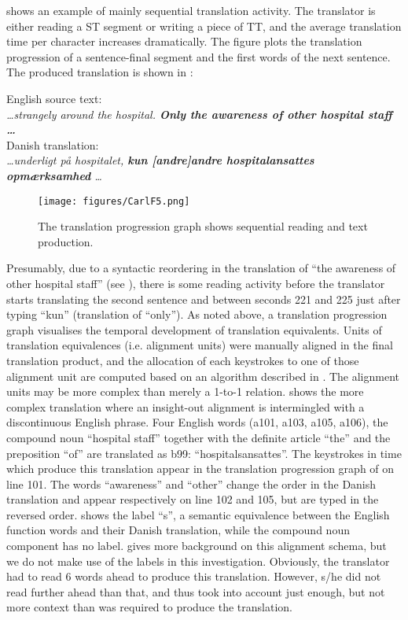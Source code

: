 \documentclass[output=paper]{LSP/langsci}
\begin{document}
 shows an example of mainly sequential translation activity. The translator is either reading a ST segment or writing a piece of TT, and the average translation time per character increases dramatically. The figure plots the translation progression of a sentence-final segment and the first words of the next sentence. The produced translation is shown in : 

\ea\label{ex:carl:4}
English source text:\\
\textit{\ldots strangely around the hospital. \textbf{Only the awareness of other hospital staff \ldots}}\\
Danish translation:\\
\textit{\ldots underligt på hospitalet, \textbf{kun [andre]andre   hospitalansattes  opmærksamhed} \ldots}
\z

\begin{figure}
\texttt{[image: figures/CarlF5.png]}
\caption{The translation progression graph shows sequential reading and text production.}
\label{fig:carl:5}
\end{figure} 

Presumably, due to a syntactic reordering in the translation of ``the awareness of other hospital staff'' (see ), there is some reading activity before the translator starts translating the second sentence and between seconds 221 and 225 just after typing ``kun'' (translation of ``only''). As noted above, a translation progression graph visualises the temporal development of translation equivalents. Units of translation equivalences (i.e. alignment units) were manually aligned in the final translation product, and the allocation of each keystrokes to one of those alignment unit are computed based on an algorithm described in \citet{Carl2009}. The alignment units may be more complex than merely a 1-to-1 relation.  shows the more complex translation where an insight-out alignment is intermingled with a discontinuous English phrase.  Four English words (a101, a103, a105, a106), the compound noun ``hospital staff'' together with the definite article ``the'' and the preposition ``of'' are translated as b99: ``hospitalsansattes''. The keystrokes in time which produce this translation appear in the translation progression graph of  on line 101.  The words ``awareness'' and ``other'' change the order in the Danish translation and appear respectively on line 102 and 105, but are typed in the reversed order.  shows the label ``s'', a semantic equivalence between the English function words and their Danish translation, while the compound noun component has no label. \citet{Kromann2003} gives more background on this alignment schema, but we do not make use of the labels in this investigation. Obviously, the translator had to read 6 words ahead to produce this translation. However, s/he did not read further ahead than that, and thus took into account just enough, but not more context than was required to produce the translation.
\end{document}
